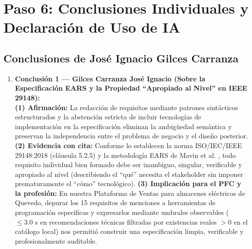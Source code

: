 
\section{Paso 6: Conclusiones Individuales y Declaración de Uso de IA}

\subsection{Conclusiones de José Ignacio Gilces Carranza}
\begin{enumerate}
	
	\item \textbf{Conclusión 1 --- Gilces Carranza José Ignacio (Sobre la Especificación EARS y la Propiedad ``Apropiado al Nivel'' en IEEE 29148):} \\
	\textbf{(1) Afirmación:} La redacción de requisitos mediante patrones sintácticos estructurados y la abstención estricta de incluir tecnologías de implementación en la especificación eliminan la ambigüedad semántica y preservan la independencia entre el problema de negocio y el diseño posterior. \textbf{(2) Evidencia con cita:} Conforme lo establecen la norma ISO/IEC/IEEE 29148:2018 (cláusula 5.2.5) \cite{ieee29148} y la metodología EARS de Mavin et al. \cite{mavin2009ears}, todo requisito individual bien formado debe ser inambiguo, singular, verificable y apropiado al nivel (describiendo el ``qué'' necesita el stakeholder sin imponer prematuramente el ``cómo'' tecnológico). \textbf{(3) Implicación para el PFC y la profesión:} En nuestra Plataforma de Ventas para almacenes eléctricos de Quevedo, depurar los 15 requisitos de menciones a herramientas de programación específicas y expresarlos mediante umbrales observables ($\le 3.0\text{ s}$ en recomendaciones técnicas filtradas por existencias reales $>0$ en el catálogo local) nos permitió construir una especificación limpia, verificable y profesionalmente auditable.
	

\end{enumerate}
